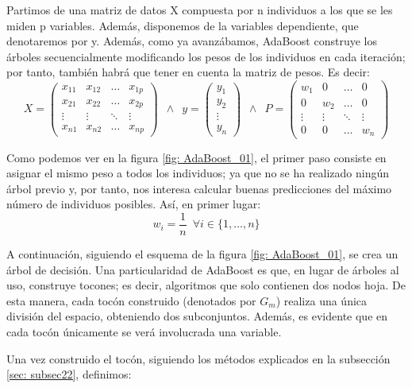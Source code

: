 \documentclass[12pt,twoside]{article}
\begin{document}
Partimos de una matriz de datos X compuesta por n individuos a los que se les miden p variables. Además, disponemos de la variables dependiente, que denotaremos por y. Además, como ya avanzábamos, AdaBoost construye los árboles secuencialmente modificando los pesos de los individuos en cada iteración; por tanto, también habrá que tener en cuenta la matriz de pesos. Es decir:
\begin{equation*}
X =
\begin{pmatrix}
x_{11} & x_{12} & \dots & x_{1p} \\
x_{21} & x_{22} & \dots & x_{2p} \\
\vdots & \vdots & \ddots & \vdots \\
x_{n1} & x_{n2} & \dots & x_{np} 
\end{pmatrix}
\, \, \, 
\wedge
\, \, \,
y = 
\begin{pmatrix}
y_1 \\
y_2 \\
\vdots \\
y_n
\end{pmatrix}
\, \, \,
\wedge
\, \, \,
P =
\begin{pmatrix}
w_1 & 0 & \dots & 0 \\
0 & w_2 & \dots & 0 \\
\vdots & \vdots & \ddots & \vdots \\
0 & 0 & \dots & w_n
\end{pmatrix}
\end{equation*}

Como podemos ver en la figura \ref{fig: AdaBoost_01}, el primer paso consiste en asignar el mismo peso a todos los individuos; ya que no se ha realizado ningún árbol previo y, por tanto, nos interesa calcular buenas predicciones del máximo número de individuos posibles. Así, en primer lugar:
\begin{equation*}
w_i = \frac{1}{n} \, \, \, \forall i \in \{1, \dots, n \}
\end{equation*}

A continuación, siguiendo el esquema de la figura \ref{fig: AdaBoost_01}, se crea un árbol de decisión. Una particularidad de AdaBoost es que, en lugar de árboles al uso, construye tocones; es decir, algoritmos que solo contienen dos nodos hoja. De esta manera, cada tocón construido (denotados por $G_m$) realiza una única división del espacio, obteniendo dos subconjuntos. Además, es evidente que en cada tocón únicamente se verá involucrada una variable.

Una vez construido el tocón, siguiendo los métodos explicados en la subsección \ref{sec: subsec22}, definimos:
\end{document}
